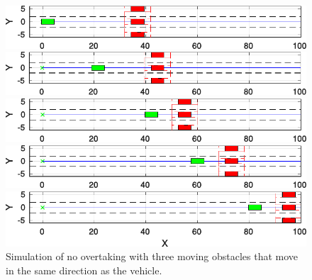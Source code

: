\begin{figure}[h!]
	\centering
	\begin{minipage}[t]{\textwidth}
		\includegraphics[width=\textwidth]{./figure/no_overtaking/no_overtaking_1.pdf}
	\end{minipage}
	\begin{minipage}[t]{\textwidth}
		\includegraphics[width=\textwidth]{./figure/no_overtaking/no_overtaking_1_5.pdf}
	\end{minipage}
	\begin{minipage}[t]{\textwidth}
		\includegraphics[width=\textwidth]{./figure/no_overtaking/no_overtaking_2.pdf}
	\end{minipage}
	\begin{minipage}[t]{\textwidth}
		\includegraphics[width=\textwidth]{./figure/no_overtaking/no_overtaking_3.pdf}
	\end{minipage}
	\begin{minipage}[t]{\textwidth}
		\includegraphics[width=\textwidth]{./figure/no_overtaking/no_overtaking_4.pdf}
	\end{minipage}
	\caption{Simulation of no overtaking with three moving obstacles that move in the same direction as the vehicle.}
	\label{fig:obstacleAvoidance_no_overtaking}
\end{figure}

